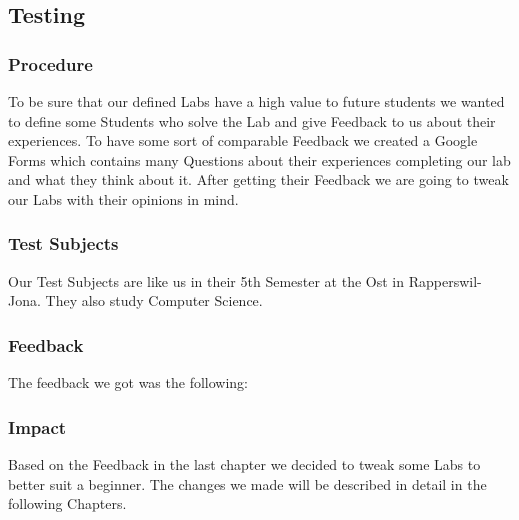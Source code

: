 \subsection{Testing}
\subsubsection{Procedure}
To be sure that our defined Labs have a high value to future students we wanted to define some Students who solve the Lab and give Feedback to us about their experiences. To have some sort of comparable Feedback we created a Google Forms which contains many Questions about their experiences completing our lab and what they think about it. After getting their Feedback we are going to tweak our Labs with their opinions in mind.

\subsubsection{Test Subjects}
Our Test Subjects are like us in their 5th Semester at the Ost in Rapperswil-Jona. They also study Computer Science.

\subsubsection{Feedback}
The feedback we got was the following:

\subsubsection{Impact}
Based on the Feedback in the last chapter we decided to tweak some Labs to better suit a beginner. The changes we made will be described in detail in the following Chapters.
